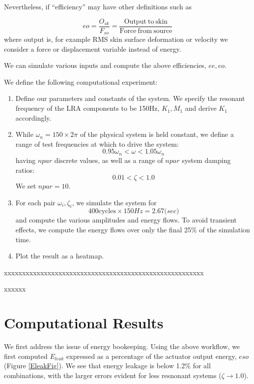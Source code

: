 \documentclass[letterpaper,11pt]{article}
\begin{document}
Nevertheless, if ``efficiency'' may have other definitions such as

\[
eo = \frac {O_{sk}}  {F_{so}} = \frac {\mathrm{Output~to ~skin} } { \mathrm {Force~from~source} }
\]
where output is, for example RMS skin surface deformation or velocity
we consider a force or displacement variable instead of energy.

We can simulate various inputs and compute the above efficiencies, $ee, eo$.

We define the following computational experiment:

\begin{enumerate}
    \item Define our parameters and constants of the system. We specify the resonant
    frequency of the LRA components to be 150Hz, $K_1, M_1$ and derive $K_1$ accordingly.

    \item While $\omega_n = 150\times2\pi$ of the physical system
    is held constant, we define a range of test
    frequencies at which to drive the system:
        \[
            0.95 \omega_n < \omega < 1.05 \omega_n
            \]
        having $npar$ discrete values, as well as a range of $npar$ system damping ratios:
            \[
                0.01 < \zeta < 1.0
                \]
    We set $npar=10$.

    \item For each pair $\omega_i, \zeta_i$, we simulate the system for
    \[
    400 \mathrm{cycles}\times 150 Hz = 2.67 \mathrm(sec)
    \]
    and compute the various  amplitudes and energy flows.
    To avoid transient effects, we compute the energy flows over only the final 25\%
    of the simulation time.

    \item Plot the result as a heatmap.

\end{enumerate}

xxxxxxxxxxxxxxxxxxxxxxxxxxxxxxxxxxxxxxxxxxxxxxxxxxxxxxx

xxxxxx



\section{Computational Results}

We first address the issue of energy bookeeping.  Using the above workflow, we
first computed $E_{leak}$ expressed as a percentage of the actuator output energy,
$eso$ (Figure \ref{EleakFig}).   We see that energy leakage is below 1.2\%
for all combinations, with the larger errors evident for less resnonant
systems ($\zeta \to 1.0$).
\end{document}
